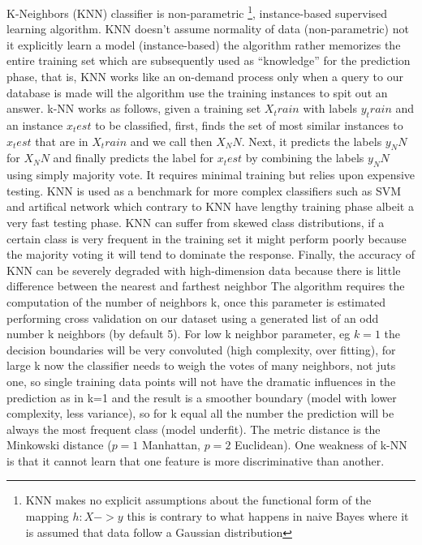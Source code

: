 \documentclass[11pt]{article}
\begin{document}
K-Neighbors (KNN) classifier is non-parametric \footnote{KNN makes no explicit assumptions about the functional form of the mapping $h:X->y$ this is contrary to what happens in naive Bayes where it is assumed that data follow a Gaussian distribution}, instance-based supervised learning algorithm. KNN doesn't assume normality of data (non-parametric) not it explicitly learn a model (instance-based) the algorithm rather memorizes the entire training set which are subsequently used as “knowledge” for the prediction phase, that is, KNN works like an on-demand process only when a query to our database is made will the algorithm use the training instances to spit out an answer. 
k-NN works as follows, given a training set $X_train$ with labels $y_train$ and an instance $x_test$ to be classified, first, finds the set of most similar instances to $x_test$ that are in $X_train$ and we call then $X_NN$. Next, it predicts the labels $y_NN$ for $X_NN$ and finally predicts the label for $x_test$ by combining the labels $y_NN$ using simply majority vote. 
It requires minimal training but relies upon expensive testing. KNN is used as a benchmark for more complex classifiers such as SVM and artifical network which contrary to KNN have lengthy training phase albeit a very fast testing phase. KNN can suffer from skewed class distributions, if a certain class is very frequent in the training set it might perform poorly because the majority voting 
it will tend to dominate the response. Finally, the accuracy of KNN can be severely degraded with high-dimension data because there is little difference between the nearest and farthest neighbor
The algorithm requires the computation of the number of neighbors k, once this parameter is estimated performing cross validation on our dataset using a generated list of an odd number k neighbors (by default 5). For low k neighbor parameter, eg $k=1$ the decision boundaries will be very convoluted (high complexity, over fitting), for large k now the classifier needs to weigh the votes of many neighbors, not juts one, so single training data points will not have the dramatic influences in the prediction as in k=1 and the result is a smoother boundary (model with lower complexity, less variance), so for k equal all the number the prediction will be always the most frequent class (model underfit). The metric distance is the Minkowski distance ($p=1$ Manhattan, $p=2$ Euclidean). 
One weakness of k-NN  is that it cannot learn that one feature is more discriminative than another.
\end{document}
